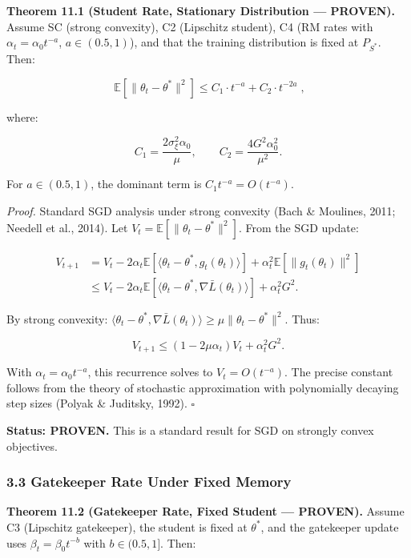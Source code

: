\documentclass[
  12pt,
]{ctexart}
\begin{document}
\textbf{Theorem 11.1 (Student Rate, Stationary Distribution ---
PROVEN).} Assume SC (strong convexity), C2 (Lipschitz student), C4 (RM
rates with \(\alpha_t = \alpha_0 t^{-a}\), \(a \in (0.5, 1)\)), and that
the training distribution is fixed at \(P_{S^*}\). Then:

\[\boxed{\;\mathbb{E}[\|\theta_t - \theta^*\|^2] \leq C_1 \cdot t^{-a} + C_2 \cdot t^{-2a}\;},\]

where:

\[C_1 = \frac{2\sigma_\xi^2 \alpha_0}{\mu}, \qquad C_2 = \frac{4 G^2 \alpha_0^2}{\mu^2}.\]

For \(a \in (0.5, 1)\), the dominant term is \(C_1 t^{-a} = O(t^{-a})\).

\emph{Proof.} Standard SGD analysis under strong convexity (Bach \&
Moulines, 2011; Needell et al., 2014). Let
\(V_t = \mathbb{E}[\|\theta_t - \theta^*\|^2]\). From the SGD update:

\[\begin{aligned}
V_{t+1} &= V_t - 2\alpha_t \mathbb{E}[\langle \theta_t - \theta^*, g_t(\theta_t) \rangle] + \alpha_t^2 \mathbb{E}[\|g_t(\theta_t)\|^2] \\
&\leq V_t - 2\alpha_t \mathbb{E}[\langle \theta_t - \theta^*, \nabla \bar{L}(\theta_t) \rangle] + \alpha_t^2 G^2.
\end{aligned}\]

By strong convexity:
\(\langle \theta_t - \theta^*, \nabla \bar{L}(\theta_t) \rangle \geq \mu \|\theta_t - \theta^*\|^2\).
Thus:

\[V_{t+1} \leq (1 - 2\mu \alpha_t) V_t + \alpha_t^2 G^2.\]

With \(\alpha_t = \alpha_0 t^{-a}\), this recurrence solves to
\(V_t = O(t^{-a})\). The precise constant follows from the theory of
stochastic approximation with polynomially decaying step sizes (Polyak
\& Juditsky, 1992). \(\square\)

\textbf{Status: PROVEN.} This is a standard result for SGD on strongly
convex objectives.

\subsubsection{3.3 Gatekeeper Rate Under Fixed
Memory}\label{gatekeeper-rate-under-fixed-memory}

\textbf{Theorem 11.2 (Gatekeeper Rate, Fixed Student --- PROVEN).}
Assume C3 (Lipschitz gatekeeper), the student is fixed at \(\theta^*\),
and the gatekeeper update uses \(\beta_t = \beta_0 t^{-b}\) with
\(b \in (0.5, 1]\). Then:
\end{document}
